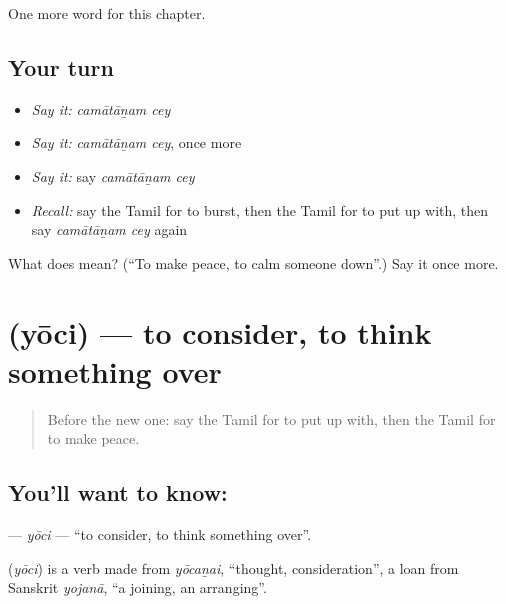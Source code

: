 \begin{grammarlens}[title={What you've built}]
One more word for this chapter.
\end{grammarlens}

\subsection*{Your turn}
\begin{itemize}
\raggedright
  \item \emph{Say it:} \emph{camātāṉam cey}
  \item \emph{Say it:} \emph{camātāṉam cey}, once more
  \item \emph{Say it:} say \emph{camātāṉam cey}
  \item \emph{Recall:} say the Tamil for to burst, then the Tamil for to put up with, then say \emph{camātāṉam cey} again
\end{itemize}

\begin{tcolorbox}[breakable,colback=teal!4,colframe=teal!35!black,title={Before you move on}]
What does   mean? (\textquotedblleft{}To make peace, to calm someone down\textquotedblright{}.) Say it once more.
\end{tcolorbox}
\section[\texorpdfstring{\ta{யோசி} (yōci)}{யோசி (yōci)}]{ (yōci) — to consider, to think something over}

\label{lesson:TA-C166-yoci}



\begin{quote}
Before the new one: say the Tamil for to put up with, then the Tamil for to make peace.
\end{quote}

\subsection*{You'll want to know: }
\textbf{} — \emph{yōci} — \textquotedblleft{}to consider, to think something over\textquotedblright{}.

\begin{cousinweb}
\textbf{} (\emph{yōci}) is a verb made from \emph{yōcaṉai}, \textquotedblleft{}thought, consideration\textquotedblright{}, a loan from Sanskrit \emph{yojanā}, \textquotedblleft{}a joining, an arranging\textquotedblright{}.
\end{cousinweb}

